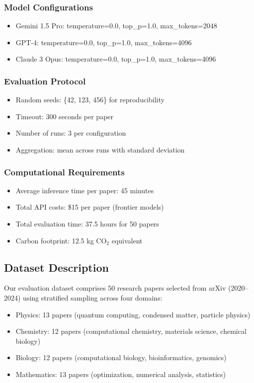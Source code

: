 \documentclass[10pt]{article}
\begin{document}
\subsubsection{Model Configurations}
\begin{itemize}
    \item Gemini 1.5 Pro: temperature=0.0, top\_p=1.0, max\_tokens=2048
    \item GPT-4: temperature=0.0, top\_p=1.0, max\_tokens=4096
    \item Claude 3 Opus: temperature=0.0, top\_p=1.0, max\_tokens=4096
\end{itemize}

\subsubsection{Evaluation Protocol}
\begin{itemize}
    \item Random seeds: \{42, 123, 456\} for reproducibility
    \item Timeout: 300 seconds per paper
    \item Number of runs: 3 per configuration
    \item Aggregation: mean across runs with standard deviation
\end{itemize}

\subsubsection{Computational Requirements}
\begin{itemize}
    \item Average inference time per paper: 45 minutes
    \item Total API costs: \$15 per paper (frontier models)
    \item Total evaluation time: 37.5 hours for 50 papers
    \item Carbon footprint: 12.5 kg CO$_2$ equivalent
\end{itemize}

\subsection{Dataset Description}

Our evaluation dataset comprises 50 research papers selected from arXiv (2020--2024) using stratified sampling across four domains:
\begin{itemize}
    \item Physics: 13 papers (quantum computing, condensed matter, particle physics)
    \item Chemistry: 12 papers (computational chemistry, materials science, chemical biology)
    \item Biology: 12 papers (computational biology, bioinformatics, genomics)
    \item Mathematics: 13 papers (optimization, numerical analysis, statistics)
\end{itemize}
\end{document}
